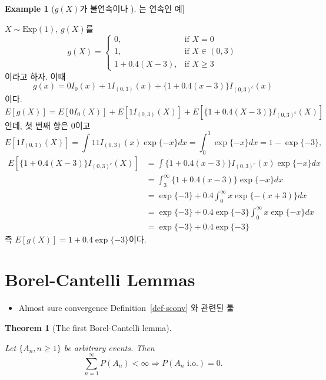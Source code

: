 \documentclass[
  letterpaper,
  DIV=11,
  numbers=noendperiod]{scrreprt}
\providecommand{\tightlist}{%
  \setlength{\itemsep}{0pt}\setlength{\parskip}{0pt}}
\theoremstyle{definition}
\theoremstyle{plain}
\newtheorem{theorem}{Theorem}[chapter]
\theoremstyle{plain}
\theoremstyle{definition}
\newtheorem{example}{Example}[chapter]
\theoremstyle{plain}
\theoremstyle{definition}
\theoremstyle{remark}
\begin{document}
\begin{example}[\(g(X)\)가 불연속이나 \(E[g(X)]\)는 연속인
예]\protect\hypertarget{exm-expcont}{}\label{exm-expcont}

\(X\sim \text{Exp}(1)\), \(g(X)\)를 \[
g(X) =
\begin{cases}
0, & \text{if }X=0\\
1, & \text{if }X\in (0,3)\\
1+0.4 (X-3), & \text{if }X \geq 3
\end{cases}
\] 이라고 하자. 이때 \[
g(x) = 0I_{0}(x) + 1I_{(0,3)}(x) + \{ 1+0.4 (x-3) \} I_{(0,3)^c}(x)
\] 이다. \[
E[g(X)] = E[0I_{0}(X)] + E[1I_{(0,3)}(X)] + E[\{1+0.4(X-3)\}I_{(0,3)^c}(X)]
\] 인데, 첫 번째 항은 0이고 \[
E[1I_{(0,3)}(X)]  = \int 1 1I_{(0,3)}(x)\exp\{-x\}dx = \int_0^3 \exp \{-x\} dx = 1-\exp \{-3\},
\] \[
\begin{aligned}
E[\{1+0.4(X-3)\}I_{(0,3)^c}(X)] &= \int \{1+0.4(x-3) \} I_{(0,3)^c}(x)\exp\{-x\}dx\\
&= \int_3^{\infty}\{1+0.4(x-3) \}\exp \{-x\}dx\\
&= \exp \{-3\}+0.4 \int_0^{\infty} x\exp \{-(x+3)\}dx\\
&= \exp \{-3\}+0.4\exp \{-3\} \int_0^{\infty} x \exp \{-x\}dx\\
&= \exp \{-3\} + 0.4 \exp \{-3\}
\end{aligned}
\] 즉 \(E[g(X)] = 1+0.4\exp\{-3\}\)이다.

\end{example}

\section{Borel-Cantelli Lemmas}\label{borel-cantelli-lemmas}

\begin{itemize}
\tightlist
\item
  Almost sure convergence Definition~\ref{def-sconv} 와 관련된 툴
\end{itemize}

\begin{theorem}[The first Borel-Cantelli
lemma]\protect\hypertarget{thm-firstborelcantelli}{}\label{thm-firstborelcantelli}

Let \(\{A_n, n \geq 1\}\) be arbitrary events. Then \[
\sum_{n=1}^{\infty}P(A_n) < \infty \Longrightarrow P(A_n \text{ i.o.})=0.
\]

\end{theorem}
\end{document}

